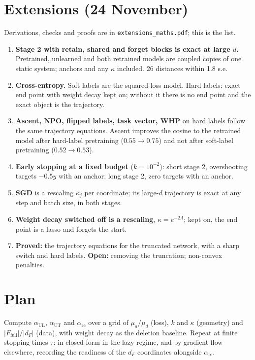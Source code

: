 \documentclass[10pt]{article}
\newcommand{\Ff}{F_{\mathrm{full}}}
\begin{document}
\section{Extensions (24 November)}
Derivations, checks and proofs are in \texttt{extensions\_maths.pdf}; this is the list.
\begin{enumerate}\setlength{\itemsep}{1pt}
\item \textbf{Stage 2 with retain, shared and forget blocks is exact at large $d$.} Pretrained, unlearned and both retrained models are coupled copies of one static system; anchors and any $\kappa$ included. 26 distances within 1.8 s.e.
\item \textbf{Cross-entropy.} Soft labels are the squared-loss model. Hard labels: exact end point with weight decay kept on; without it there is no end point and the exact object is the trajectory.
\item \textbf{Ascent, NPO, flipped labels, task vector, WHP} on hard labels follow the same trajectory equations. Ascent improves the cosine to the retrained model after hard-label pretraining ($0.55\to0.75$) and not after soft-label pretraining ($0.52\to0.53$).
\item \textbf{Early stopping at a fixed budget} ($k=10^{-2}$): short stage 2, overshooting targets $-0.5y$ with an anchor; long stage 2, zero targets with an anchor.
\item \textbf{SGD} is a rescaling $\kappa_j$ per coordinate; its large-$d$ trajectory is exact at any step and batch size, in both stages.
\item \textbf{Weight decay switched off is a rescaling}, $\kappa=e^{-2\Lambda}$; kept on, the end point is a lasso and forgets the start.
\item \textbf{Proved:} the trajectory equations for the truncated network, with a sharp switch and hard labels. \textbf{Open:} removing the truncation; non-convex penalties.
\end{enumerate}

\section{Plan}
Compute $\alpha_{\mathrm{UL}}$, $\alpha_{\mathrm{UT}}$ and $\alpha_{\mathrm{re}}$ over a grid of $\mu_a/\mu_d$ (loss), $k$ and $\kappa$ (geometry) and $|\Ff|/|d_F|$ (data), with weight decay as the deletion baseline. Repeat at finite stopping times $\tau$: in closed form in the lazy regime, and by gradient flow elsewhere, recording the readiness of the $d_F$ coordinates alongside $\alpha_{\mathrm{re}}$.
\end{document}
